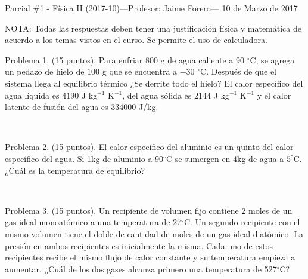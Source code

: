 \documentclass{article}
\begin{document}
\pagestyle{empty}
\noindent

\noindent
{\sc Parcial \#1  - Física II (2017-10)---Profesor: Jaime Forero--- 10 de Marzo de 2017}

NOTA: Todas las respuestas deben tener una justificaci\'on f\'isica y
matem\'atica de acuerdo a los temas vistos en el curso. Se permite el
uso de calculadora.






  Problema 1. (15 puntos). Para enfriar $800$ g de agua caliente a 90 $^\circ$C,
  se agrega un pedazo de hielo de $100$ g que se encuentra a $-30$
  $^{\circ}$C. Despu\'es de que el sistema llega al equilibrio
  t\'ermico ¿Se derrite todo el hielo? El calor espec\'ifico
  del agua l\'iquida es $4190$ J kg$^{-1}$ K$^{-1}$, del agua
  s\'olida es $2144$ J kg$^{-1}$ K$^{-1}$ y el calor latente de
  fusi\'on del agua es $334000$ J/kg. 

\

Problema 2. (15 puntos). El calor espec\'ifico del aluminio es un quinto del calor espec\'ifico
del agua. Si 1kg de aluminio a 90$^\circ$C se sumergen en 4kg de agua
a $5^\circ$C. ¿Cu\'al es la temperatura de equilibrio?  

\



Problema 3. (15 puntos). 
Un recipiente de volumen fijo contiene 2 moles de un gas ideal
monoat\'omico a una temperatura de 27$^{\circ}$C. Un segundo
recipiente con el mismo volumen tiene el doble de cantidad de moles de
un gas ideal diat\'omico. La presi\'on en ambos recipientes es
inicialmente la misma. Cada uno de estos recipientes recibe el mismo
flujo de calor constante y su temperatura empieza a aumentar. ¿Cu\'al
de los dos gases alcanza primero una temperatura de 527$^{\circ}$C?     
\end{document}
